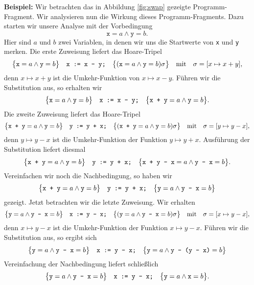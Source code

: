 \vspace*{0.3cm}

\noindent
\textbf{Beispiel:}
Wir betrachten  das in
Abbildung \ref{fig:swap} gezeigte Programm-Fragment.  Wir analysieren nun die Wirkung
dieses Programm-Fragments.  Dazu starten wir unsere Analyse mit der Vorbedingung
\[ \texttt{x} = a \wedge \texttt{y} = b. \]
Hier sind $a$ und $b$ zwei Variablen, in denen wir uns die Startwerte von \texttt{x} und
\texttt{y} merken.  Die erste Zuweisung liefert das Hoare-Tripel
\[ \bigl\{\texttt{x} = a \wedge \texttt{y} = b\bigr\}\quad\texttt{x := x - y;}\quad\bigl\{(\texttt{x} = a \wedge \texttt{y} = b)\sigma\bigr\} 
   \quad \mathrm{mit} \quad \sigma = [x \mapsto x + y],
\]
denn $x \mapsto x + y$ ist die Umkehr-Funktion von $x \mapsto x - y$.  F\"uhren wir die Substitution
aus, so erhalten wir
\begin{equation}
  \label{eq:swap1}
 \bigl\{\texttt{x} = a \wedge \texttt{y} = b\bigr\}\quad\texttt{x := x - y;}\quad\bigl\{\texttt{x + y} = a \wedge \texttt{y} = b\bigr\}.   
\end{equation}
Die zweite Zuweisung liefert das Hoare-Tripel
\[ \bigl\{\texttt{x + y} = a \wedge \texttt{y} = b\bigr\}\quad\texttt{y := y + x;}\quad\bigl\{(\texttt{x + y} = a \wedge \texttt{y} = b)\sigma\bigr\} 
   \quad \mathrm{mit} \quad \sigma = [y \mapsto y - x],
\]
denn $y \mapsto y - x$ ist die Umkehr-Funktion der Funktion $y \mapsto y + x$.
Ausf\"uhrung der Substitution liefert diesmal
\[ \bigl\{\texttt{x + y} = a \wedge \texttt{y} = b\bigr\}\quad\texttt{y := y + x;}\quad\bigl\{
          \texttt{x + y - x} = a \wedge \texttt{y - x} = b\bigr\}.
\]
Vereinfachen wir noch die Nachbedingung, so haben wir 
\begin{equation}
  \label{eq:swap2}
 \bigl\{\texttt{x + y} = a \wedge \texttt{y} = b\bigr\}\quad\texttt{y := y + x;}\quad\bigl\{ \texttt{y} = a \wedge \texttt{y - x} = b\bigr\}  
\end{equation}
gezeigt. Jetzt betrachten wir die letzte Zuweisung.  Wir erhalten
\[ \bigl\{\texttt{y} = a \wedge \texttt{y - x} = b\bigr\}\quad\texttt{x := y - x;}\quad\bigl\{
          (\texttt{y} = a \wedge \texttt{y - x} = b)\sigma\bigr\} 
   \quad \mathrm{mit} \quad \sigma = [x \mapsto y - x],
\]
denn $x \mapsto y - x$ ist die Umkehr-Funktion der Funktion $x \mapsto y - x$.
F\"uhren wir die Substitution aus, so ergibt sich
\[ \bigl\{\texttt{y} = a \wedge \texttt{y - x} = b\bigr\}\quad\texttt{x := y - x;}\quad\bigl\{
          \texttt{y} = a \wedge \texttt{y - (y - x)} = b\bigr\} 
\]
Vereinfachung der Nachbedingung liefert schlie{\ss}lich
\begin{equation}
  \label{eq:swap3}
  \bigl\{\texttt{y} = a \wedge \texttt{y - x} = b\bigr\}\quad\texttt{x := y - x;}\quad\bigl\{ \texttt{y} = a \wedge \texttt{x} = b\bigr\}.   
\end{equation}
